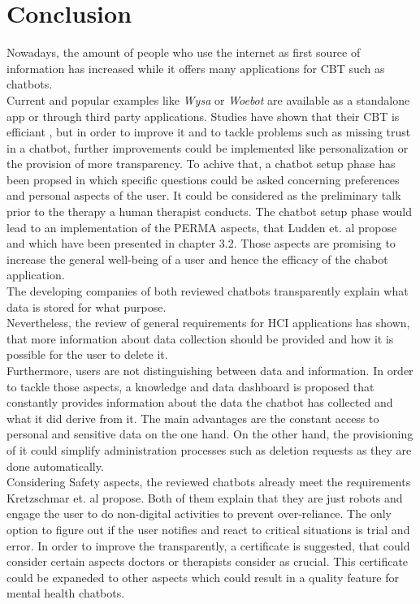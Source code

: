 \documentclass[sigconf, nonacm]{acmart}
\begin{document}
\section{Conclusion}
Nowadays, the amount of people who use the internet as first source of information has increased \cite{Wyatt2015} while it offers many applications for CBT such as chatbots. 
\\
Current and popular examples like \emph{Wysa} or \emph{Woebot} are available as a standalone app or through third party applications. Studies have shown that their CBT is efficiant \cite{Fitzpatrick2017,Inkster}, but in order to improve it and to tackle problems such as missing trust in a chatbot, further improvements could be implemented like personalization 
or the provision of more transparency. To achive that, a chatbot setup phase has been propsed in which specific questions could be asked concerning preferences and personal aspects of the user. It could be considered as the preliminary talk prior to the therapy a human therapist conducts.
The chatbot setup phase would lead to an implementation of the PERMA aspects, that Ludden et. al \cite{Ludden2015} propose and which have been presented in chapter 3.2. Those aspects are promising to increase the general well-being of a user and hence the efficacy of the chabot application.
\\
The developing companies of both reviewed chatbots transparently explain what data is stored for what purpose.\\
Nevertheless, the review of general requirements for HCI applications has shown, that more information about data collection should be provided and how it is possible for the user to delete it.\cite{Shamim2021}
\\
Furthermore, users are not distinguishing between data and information.\cite{Lee2011}
In order to tackle those aspects, a knowledge and data dashboard is proposed that constantly provides information about the data the chatbot has collected and what it did derive from it.
The main advantages are the constant access to personal and sensitive data on the one hand. On the other hand, the provisioning of it could simplify administration processes such as deletion requests as they are done automatically.
\\
Considering Safety aspects, the reviewed chatbots already meet the requirements Kretzschmar et. al \cite{Kretzschmar2019} propose. Both of them explain that they are just robots and engage the user to do non-digital activities to prevent over-reliance.
The only option to figure out if the user notifies and react to critical situations is trial and error. In order to improve the transparently, a certificate is suggested, that could consider certain aspects doctors or therapists consider as crucial.
This certificate could be expaneded to other aspects which could result in a quality feature for mental health chatbots.






\appendix
\end{document}
